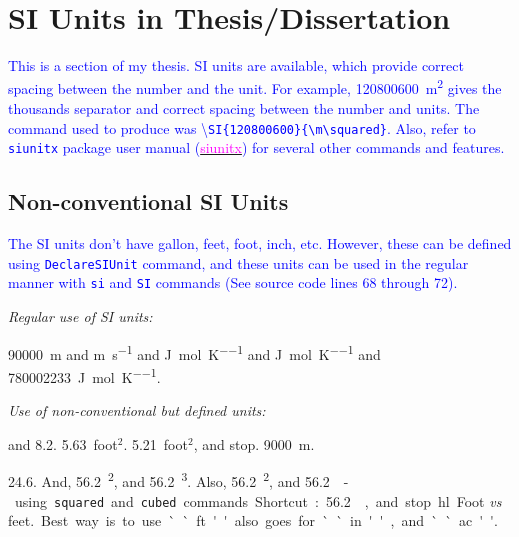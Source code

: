 \documentclass[phd,showframe]{ndsu-thesis-2022}
\newcommand\italk[1]{\textcolor{blue}{#1}}  %
\newcommand{\sqft}[1]{\qty{#1}{foot}$^2$\xspace}%
\newcommand{\cuft}[1]{\qty{#1}{\cubic\ft}\xspace}%
\begin{document}

\section{SI Units in Thesis/Dissertation}
\italk{This is a section of my thesis. SI units are available, which provide correct spacing between the number and the unit. For example, \qty{120800600}{\m\squared} gives the thousands separator and correct spacing between the number and units. The command used to produce was \textbackslash\texttt{SI\{120800600\}\{\textbackslash m\textbackslash squared\}}.  Also, refer to \texttt{siunitx} package user manual (\href{https://mirror.mwt.me/ctan/macros/latex/contrib/siunitx/siunitx.pdf}{\textcolor{magenta}{siunitx}}) for several other commands and features.} 

\subsection{Non-conventional SI Units}
\italk{The SI units don't have gallon, feet, foot, inch, etc. However, these can be defined using \texttt{DeclareSIUnit} command, and these units can be used in the regular manner with \texttt{si} and \texttt{SI} commands (See source code lines 68 through 72).} 

\noindent\emph{Regular use of SI units:}

\qty{90000}{\m} and \unit{\m\per\s} and \unit{\joule\per\mole\per\kelvin} and \unit{\joule\per\mole\per\kelvin} and \qty{780002233}{\joule\per\mole\per\kelvin}.

\noindent\emph{Use of non-conventional but defined units:}

\unit{\gal}  and \qty{8.2}{\gal}. \qty{5.63}{foot}$^2$\xspace. \sqft{5.21}, and stop. \qty{9000}{\m}.

\qty{24.6}{\ft}. And, \qty{56.2}{\ft\tothe{2}}, and \qty{56.2}{\ft\tothe{3}}. Also, \qty{56.2}{\ft\squared}, and \qty{56.2}{\cubic\ft} - using \texttt{squared} and \texttt{cubed} commands. Shortcut: \cuft{56.2}, and stop.

\hl{Foot \emph{vs} feet.} Best way is to use ``ft'' also goes for ``in'', and ``ac''. 
\end{document}
